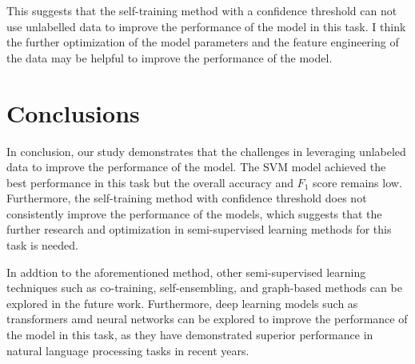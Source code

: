 \documentclass[11pt]{article}
\begin{document}
This suggests that the self-training method with a confidence threshold can not use unlabelled data to improve the performance of the model in this task.
I think the further optimization of the model parameters and the feature engineering of the data may be helpful to improve the performance of the model.



\section{Conclusions}

In conclusion, our study demonstrates that the challenges in leveraging unlabeled data to improve the performance of the model.
The SVM model achieved the best performance in this task but the overall accuracy and $F_1$ score remains low.
Furthermore, the self-training method with confidence threshold does not consistently improve the performance of the models,
which suggests that the further research and optimization in semi-supervised learning methods for this task is needed.

In addtion to the aforementioned method, other semi-supervised learning techniques such as co-training, self-ensembling, and graph-based methods can be explored in the future work.
Furthermore, deep learning models such as transformers amd neural networks can be explored to improve the performance of the model in this task,
as they have demonstrated superior performance in natural language processing tasks in recent years.


\nocite{*}


\end{document}
